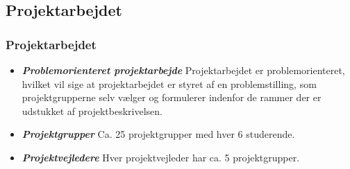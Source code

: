 \documentclass[t, aspectratio=169]{beamer}
\newcommand{\textdesc}[1]{\textit{\textbf{#1}}}
\newcommand{\descitem}[1]{\item \textdesc{#1}}
\begin{document}
\subsection{Projektarbejdet}
\begin{frame}[fragile]
  \frametitle{Projektarbejdet}
  
  \vspace{7mm}
  \begin{itemize}
    \setlength\itemsep{7mm}
    \descitem{Problemorienteret projektarbejde} Projektarbejdet er problemorienteret, hvilket vil sige at projektarbejdet er styret af en problemstilling, som projektgrupperne selv vælger og formulerer indenfor de rammer der er udstukket af projektbeskrivelsen.
    \descitem{Projektgrupper} Ca. 25 projektgrupper med hver 6 studerende.
    \descitem{Projektvejledere} Hver projektvejleder har ca. 5 projektgrupper.
  \end{itemize}
\end{frame}
\end{document}
